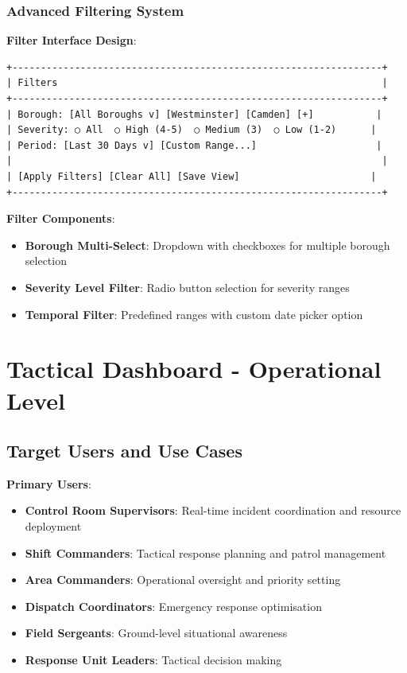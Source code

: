 \documentclass[12pt,a4paper]{article}
\begin{document}
\subsubsection{Advanced Filtering System}

\textbf{Filter Interface Design}:
\begin{verbatim}
+-----------------------------------------------------------------+
| Filters                                                         |
+-----------------------------------------------------------------+
| Borough: [All Boroughs v] [Westminster] [Camden] [+]           |
| Severity: ○ All  ○ High (4-5)  ○ Medium (3)  ○ Low (1-2)      |
| Period: [Last 30 Days v] [Custom Range...]                     |
|                                                                 |
| [Apply Filters] [Clear All] [Save View]                       |
+-----------------------------------------------------------------+
\end{verbatim}

\textbf{Filter Components}:
\begin{itemize}
    \item \textbf{Borough Multi-Select}: Dropdown with checkboxes for multiple borough selection
    \item \textbf{Severity Level Filter}: Radio button selection for severity ranges
    \item \textbf{Temporal Filter}: Predefined ranges with custom date picker option
\end{itemize}

\section{Tactical Dashboard - Operational Level}

\subsection{Target Users and Use Cases}

\textbf{Primary Users}:
\begin{itemize}
    \item \textbf{Control Room Supervisors}: Real-time incident coordination and resource deployment
    \item \textbf{Shift Commanders}: Tactical response planning and patrol management
    \item \textbf{Area Commanders}: Operational oversight and priority setting
    \item \textbf{Dispatch Coordinators}: Emergency response optimisation
    \item \textbf{Field Sergeants}: Ground-level situational awareness
    \item \textbf{Response Unit Leaders}: Tactical decision making
\end{itemize}
\end{document}
